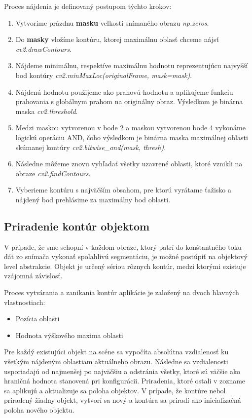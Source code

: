Proces nájdenia je definovaný postupom týchto krokov: 
\begin{enumerate}
  \item Vytvoríme prázdnu \textbf{masku} veľkosti snímaného obrazu \textit{np.zeros}.
  \item Do \textbf{masky} vložíme kontúru, ktorej maximálnu oblasť chceme nájsť \textit{cv2.drawContours}.
  \item Nájdeme minimálnu, respektíve maximálnu hodnotu reprezentujúcu najvyšší bod kontúry  \textit{cv2.minMaxLoc(originalFrame, mask=mask)}.
  \item Nájdenú hodnotu použijeme ako prahovú hodnotu a aplikujeme funkciu prahovania s globálnym prahom na originálny obraz. Výsledkom je binárna maska \textit{cv2.threshold}.
  \item Medzi maskou vytvorenou v bode 2 a maskou vytvorenou bode 4 vykonáme logickú operáciu AND, čoho výsledkom je binárna maska maximálnej oblasti skúmanej kontúry \textit{cv2.bitwise\_and(mask, thresh)}.
  \item Následne môžeme znovu vyhľadať všetky uzavrené oblasti, ktoré vznikli na obraze \textit{cv2.findContours}.
  \item Vyberieme kontúru s najväčším obsahom, pre ktorú vyrátame ťažisko a nájdený bod prehlásime za maximálny bod oblasti.
\end{enumerate}

\subsection{Priradenie kontúr objektom}
V prípade, že sme schopní v každom obraze, ktorý patrí do konštantného toku dát zo snímača vykonať spoľahlivú segmentáciu, je možné postúpiť na objektový level abstrakcie. Objekt je určený sériou rôznych kontúr, medzi ktorými existuje vzájomná závislosť.  

Proces vytvárania a zanikania kontúr aplikácie je založený na dvoch hlavných vlastnostiach:
\begin{itemize}
    \item Pozícia oblasti
    \item Hodnota výškového maxima oblasti
\end{itemize}

Pre každý existujúci objekt na scéne sa vypočíta absolútna vzdialenosť ku všetkým nájdeným oblastiam aktuálneho obrazu. Následne sa vzdialenosti usporiadajú od najmenšej po najväčšiu a odstránia všetky, ktoré sú väčšie ako hraničná hodnota stanovená pri konfigurácii. Priradenia, ktoré ostali v zozname sa aplikujú a aktualizuje sa poloha objektov. V prípade, že kontúre nebol priradený žiadny objekt, vytvorí sa nový a kontúra sa priradí ako inicializačná poloha nového objektu. 

